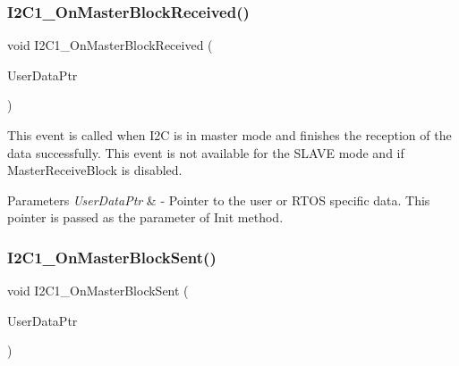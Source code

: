 \mbox{\label{group___events__module_gad0eaee8bf9e6df0596ba2542bb3e1c32}} 
\subsubsection{\texorpdfstring{I2\+C1\+\_\+\+On\+Master\+Block\+Received()}{I2C1\_OnMasterBlockReceived()}}
{\footnotesize\ttfamily void I2\+C1\+\_\+\+On\+Master\+Block\+Received (\begin{DoxyParamCaption}\item[{L\+D\+D\+\_\+\+T\+User\+Data $\ast$}]{User\+Data\+Ptr }\end{DoxyParamCaption})}



This event is called when I2C is in master mode and finishes the reception of the data successfully. This event is not available for the S\+L\+A\+VE mode and if Master\+Receive\+Block is disabled. 


\begin{DoxyParams}{Parameters}
{\em User\+Data\+Ptr} & -\/ Pointer to the user or R\+T\+OS specific data. This pointer is passed as the parameter of Init method. \\
\hline
\end{DoxyParams}
\mbox{\label{group___events__module_gad394d39c6e6d080b1ae8cd26178003f2}} 
\subsubsection{\texorpdfstring{I2\+C1\+\_\+\+On\+Master\+Block\+Sent()}{I2C1\_OnMasterBlockSent()}}
{\footnotesize\ttfamily void I2\+C1\+\_\+\+On\+Master\+Block\+Sent (\begin{DoxyParamCaption}\item[{L\+D\+D\+\_\+\+T\+User\+Data $\ast$}]{User\+Data\+Ptr }\end{DoxyParamCaption})}



